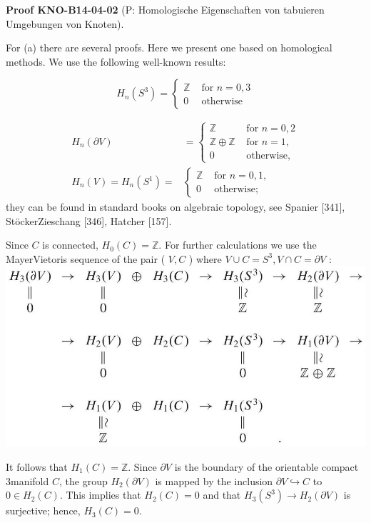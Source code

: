 \documentclass[10pt, letterpaper]{article}
\newcommand{\CustomHeading}[3]{%
  \par\medskip\noindent%
  \textbf{#1 #2} \textnormal{(#3)}.\enskip%
}
\newenvironment{PROOF}[2]{\begin{unitbox}\CustomHeading{Proof}{#1}{#2}}{\end{unitbox}}
\begin{document}
\begin{PROOF}{KNO-B14-04-02}{P: Homologische Eigenschaften von tabuieren Umgebungen von Knoten}
For (a) there are several proofs. Here we present one based on homological methods. We use the following well-known results:

$$
H_{n}\left(S^{3}\right)= \begin{cases}\mathbb{Z} & \text { for } n=0,3 \\ 0 & \text { otherwise }\end{cases}
$$

$$
\begin{aligned}
H_{n}(\partial V) & = \begin{cases}\mathbb{Z} & \text { for } n=0,2 \\
\mathbb{Z} \oplus \mathbb{Z} & \text { for } n=1, \\
0 & \text { otherwise, }\end{cases} \\
H_{n}(V)=H_{n}\left(S^{1}\right)= & \begin{cases}\mathbb{Z} & \text { for } n=0,1, \\
0 & \text { otherwise; }\end{cases}
\end{aligned}
$$
they can be found in standard books on algebraic topology, see Spanier [341], StöckerZieschang [346], Hatcher [157].

Since $C$ is connected, $H_{0}(C)=\mathbb{Z}$. For further calculations we use the MayerVietoris sequence of the pair ( $V, C$ ) where $V \cup C=S^{3}, V \cap C=\partial V$ :\\
\includegraphics[scale=0.2, center]{2025_05_21_9c06be8de7a55410f8c1g-045}

It follows that $H_{1}(C)=\mathbb{Z}$. Since $\partial V$ is the boundary of the orientable compact 3manifold $C$, the group $H_{2}(\partial V)$ is mapped by the inclusion $\partial V \hookrightarrow C$ to $0 \in H_{2}(C)$. This implies that $H_{2}(C)=0$ and that $H_{3}\left(S^{3}\right) \rightarrow H_{2}(\partial V)$ is surjective; hence, $H_{3}(C)=0$.


\end{PROOF}
\end{document}
